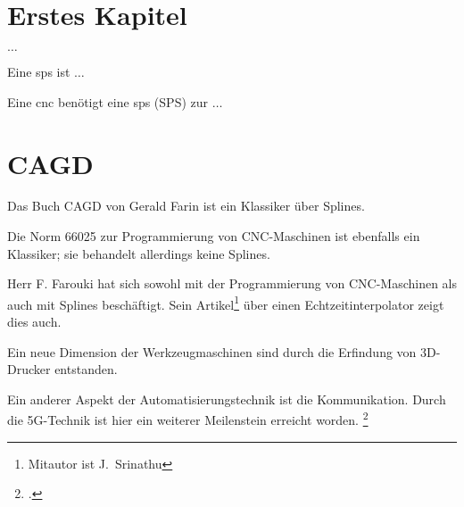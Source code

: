 %
%
%



\chapter{Erstes Kapitel}

$\ldots$

Eine \ac{sps} ist $\ldots$
\bigskip


Eine \ac{cnc} benötigt eine \ac{sps}  (SPS)  zur $\ldots$

\chapter{CAGD}

\blindtext

Das Buch CAGD von Gerald Farin ist ein Klassiker über Splines. \cite{Farin:2002}

\bigskip

Die Norm 66025 zur Programmierung von CNC-Maschinen ist ebenfalls ein Klassiker; sie behandelt allerdings keine Splines. \cite{DIN66025}

\bigskip

Herr F. Farouki hat sich sowohl mit der Programmierung von CNC-Maschinen als auch mit Splines beschäftigt. Sein Artikel\footnote{Mitautor ist J.~Srinathu} über einen Echtzeitinterpolator zeigt dies auch. \cite{Farouki:2017}

\bigskip

Ein neue Dimension der Werkzeugmaschinen sind durch die Erfindung von 3D-Drucker entstanden. \cite{Patent3D}

\bigskip


Ein anderer Aspekt der Automatisierungstechnik ist die Kommunikation. Durch die 5G-Technik ist hier ein
weiterer Meilenstein erreicht worden. \footcite{Zafeiropoulos:2020}


